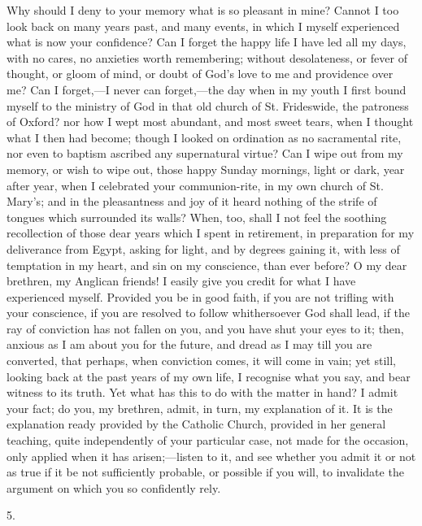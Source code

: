 Why should I deny to your memory what is so pleasant in mine?
Cannot I too look back on many years past, and many events, in which I
myself experienced what is now your confidence? Can I forget the happy
life I have led all my days, with no cares, no anxieties worth
remembering; without desolateness, or fever of thought, or gloom of
mind, or doubt of God's love to me and providence over me? Can I
forget,—I never can forget,—the day when in my youth I first bound
myself to the ministry of God in that old church of St. Frideswide,
the patroness of Oxford? nor how I wept most abundant, and most sweet
tears, when I thought what I then had become; though I looked on
ordination as no sacramental rite, nor even to baptism ascribed any
supernatural virtue? Can I wipe out from my memory, or wish to wipe
out, those happy Sunday mornings, light or dark, year after year, when
I celebrated your communion-rite, in my own church of St. Mary's; and
in the pleasantness and joy of it heard nothing of the strife of
tongues which surrounded its walls? When, too, shall I not feel the
soothing recollection of those dear years which I spent in retirement,
in preparation for my deliverance from Egypt, asking for light, and by
degrees gaining it, with less of temptation in my heart, and sin on my
conscience, than ever before? O my dear brethren, my Anglican friends!
I easily give you credit for what I have experienced myself. Provided
you be in good faith, if you are not trifling with your conscience, if
you are resolved to follow whithersoever God shall lead, if the ray of
conviction has not fallen on you, and you have shut your eyes to it;
then, anxious as I am about you for the future, and dread as I may
till you are converted, that perhaps, when conviction comes, it will
come in vain; yet still, looking back at the past years of my own life,
I recognise what you say, and bear witness to its truth. Yet what has
this to do with the matter in hand? I admit your fact; do you, my
brethren, admit, in turn, my explanation of it. It is the explanation
ready provided by the Catholic Church, provided in her general
teaching, quite independently of your particular case, not made for
the occasion, only applied when it has arisen;—listen to it, and see
whether you admit it or not as true if it be not sufficiently
probable, or possible if you will, to invalidate the argument on which
you so confidently rely.

5.

